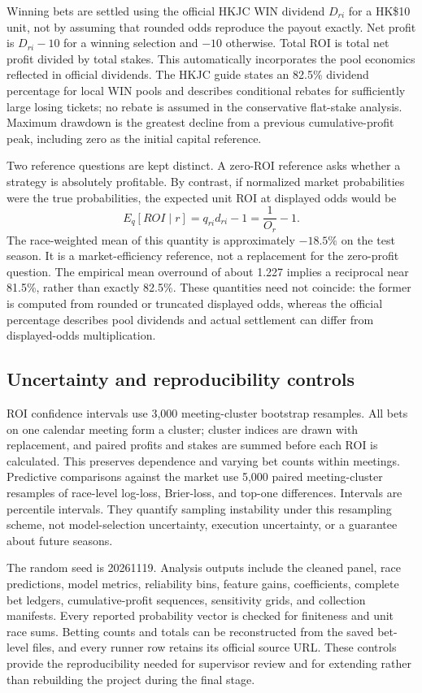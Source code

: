 Winning bets are settled using the official HKJC WIN dividend $D_{ri}$ for a HK\$10 unit, not by assuming that rounded odds reproduce the payout exactly. Net profit is $D_{ri}-10$ for a winning selection and $-10$ otherwise. Total ROI is total net profit divided by total stakes. This automatically incorporates the pool economics reflected in official dividends. The HKJC guide states an 82.5\% dividend percentage for local WIN pools and describes conditional rebates for sufficiently large losing tickets\cite{hkjcguide}; no rebate is assumed in the conservative flat-stake analysis. Maximum drawdown is the greatest decline from a previous cumulative-profit peak, including zero as the initial capital reference.

Two reference questions are kept distinct. A zero-ROI reference asks whether a strategy is absolutely profitable. By contrast, if normalized market probabilities were the true probabilities, the expected unit ROI at displayed odds would be
\begin{equation}
E_q[ROI\mid r]=q_{ri}d_{ri}-1=\frac{1}{O_r}-1.
\label{eq:market-roi-null}
\end{equation}
The race-weighted mean of this quantity is approximately $-18.5\%$ on the test season. It is a market-efficiency reference, not a replacement for the zero-profit question. The empirical mean overround of about 1.227 implies a reciprocal near 81.5\%, rather than exactly 82.5\%. These quantities need not coincide: the former is computed from rounded or truncated displayed odds, whereas the official percentage describes pool dividends and actual settlement can differ from displayed-odds multiplication.

\subsection{Uncertainty and reproducibility controls}\label{sec:methods-uncertainty}
ROI confidence intervals use 3,000 meeting-cluster bootstrap resamples. All bets on one calendar meeting form a cluster; cluster indices are drawn with replacement, and paired profits and stakes are summed before each ROI is calculated. This preserves dependence and varying bet counts within meetings. Predictive comparisons against the market use 5,000 paired meeting-cluster resamples of race-level log-loss, Brier-loss, and top-one differences. Intervals are percentile intervals. They quantify sampling instability under this resampling scheme, not model-selection uncertainty, execution uncertainty, or a guarantee about future seasons.

The random seed is \num{20261119}. Analysis outputs include the cleaned panel, race predictions, model metrics, reliability bins, feature gains, coefficients, complete bet ledgers, cumulative-profit sequences, sensitivity grids, and collection manifests. Every reported probability vector is checked for finiteness and unit race sums. Betting counts and totals can be reconstructed from the saved bet-level files, and every runner row retains its official source URL. These controls provide the reproducibility needed for supervisor review and for extending rather than rebuilding the project during the final stage.
